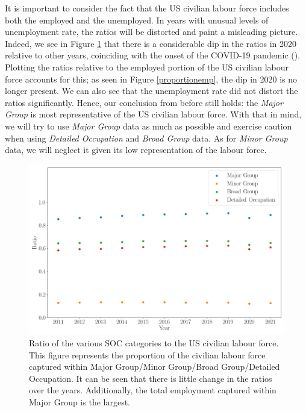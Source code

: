 \documentclass[11pt]{article}
\begin{document}
It is important to consider the fact that the US civilian labour force includes both the employed and the unemployed. In years with unusual levels of unemployment rate, the ratios will be distorted and paint a misleading picture. Indeed, we see in Figure \ref{proportion} that there is a considerable dip in the ratios in 2020 relative to other years, coinciding with the onset of the COVID-19 pandemic (\cite{covid2020unemployment,congresscovidunemployment}). Plotting the ratios relative to the employed portion of the US civilian labour force accounts for this; as seen in Figure \ref{proportionemp}, the dip in 2020 is no longer present. We can also see that the unemployment rate did not distort the ratios significantly. Hence, our conclusion from before still holds: the \emph{Major Group} is most representative of the US civilian labour force. With that in mind, we will try to use \emph{Major Group} data as much as possible and exercise caution when using \emph{Detailed Occupation} and \emph{Broad Group} data. As for \emph{Minor Group} data, we will neglect it given its low representation of the labour force.



\begin{figure}[!htb]
	\centering
	\includegraphics[width=15cm]{Figures/Proportion for all.png}
	\caption{Ratio of the various SOC categories to the US civilian labour force. This figure represents the proportion of the civilian labour force captured within Major Group/Minor Group/Broad Group/Detailed Occupation. It can be seen that there is little change in the ratios over the years. Additionally, the total employment captured within Major Group is the largest.}
	\label{proportion}
  \end{figure}
  
\end{document}
